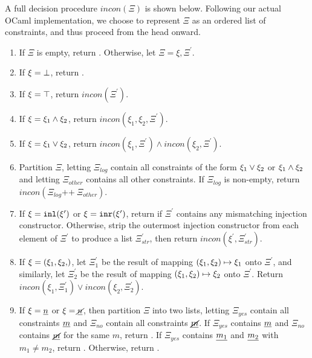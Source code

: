 A full decision procedure $incon(\Xi)$ is shown below. Following our actual OCaml implementation, we choose to represent $\Xi$ as an ordered list of constraints, and thus proceed from the head onward.

\begin{enumerate}
\item If $\Xi$ is empty, return . Otherwise, let $\Xi = \xi, \Xi^\prime$.
\item If $\xi = \bot$, return .
\item If $\xi = \top$, return $incon(\Xi^\prime)$.
\item If $\xi = \xi_1 \wedge \xi_2$, return $incon(\xi_1, \xi_2, \Xi^\prime)$.
\item If $\xi = \xi_1 \vee \xi_2$, return $incon(\xi_1, \Xi^\prime) \land incon(\xi_2, \Xi^\prime)$.
\item Partition $\Xi$, letting $\Xi_{log}$ contain all constraints of the form $\xi_1 \vee \xi_2$ or $\xi_1 \wedge \xi_2$ and letting $\Xi_{other}$ contains all other constraints. If $\Xi_{log}$ is non-empty, return $incon(\Xi_{log} \texttt{++}~ \Xi_{other})$.
\item If $\xi = \mathtt{inl}(\xi^\prime)$ or $\xi = \mathtt{inr}(\xi^\prime)$, return  if $\Xi^\prime$ contains any mismatching injection constructor. Otherwise, strip the outermost injection constructor from each element of $\Xi^\prime$ to produce a list $\Xi^\prime_{str}$, then return $incon(\xi^\prime, \Xi^\prime_{str})$.
\item If $\xi = \cpair{\xi_1, \xi_2}$, let $\Xi^\prime_1$ be the result of mapping $(\xi_1 , \xi_2) \mapsto \xi_1$ onto $\Xi^\prime$, and similarly, let $\Xi^\prime_2$ be the result of mapping $(\xi_1 , \xi_2) \mapsto \xi_2$ onto $\Xi^\prime$. Return $incon(\xi_1, \Xi^\prime_1) \lor incon(\xi_2, \Xi^\prime_2)$.
\item If $\xi = \underline{n}$ or $\xi = \underline{\cancel{n}}$, then partition $\Xi$ into two lists, letting $\Xi_{yes}$ contain all constraints $\underline{m}$ and $\Xi_{no}$ contain all constraints $\underline{\cancel{m}}$. If $\Xi_{yes}$ contains $\underline{m}$ and $\Xi_{no}$ contains $\underline{\cancel{m}}$ for the same $m$, return . If $\Xi_{yes}$ contains $\underline{m_1}$ and $\underline{m_2}$ with $m_1 \neq m_2$, return . Otherwise, return .
\end{enumerate}

